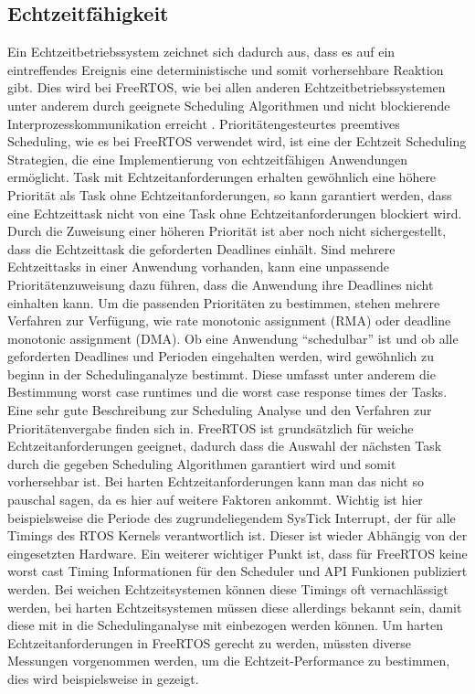 \subsection{Echtzeitfähigkeit}
Ein Echtzeitbetriebssystem zeichnet sich dadurch aus, dass es auf ein eintreffendes Ereignis eine deterministische und somit vorhersehbare Reaktion gibt. Dies wird bei FreeRTOS, wie bei allen anderen Echtzeitbetriebssystemen unter anderem durch geeignete Scheduling Algorithmen und nicht blockierende Interprozesskommunikation erreicht\cite{9780128015070} \cite{Jones:1997:CRT:269005.266689} \cite{Regehr:2001:ACR:882481.883779}. Prioritätengesteurtes preemtives Scheduling, wie es bei FreeRTOS verwendet wird, ist eine der Echtzeit Scheduling Strategien\cite{9780128015070}, die eine Implementierung von echtzeitfähigen Anwendungen ermöglicht. Task mit Echtzeitanforderungen erhalten gewöhnlich eine höhere Priorität als Task ohne Echtzeitanforderungen, so kann garantiert werden, dass eine Echtzeittask nicht von eine Task ohne Echtzeitanforderungen blockiert wird. Durch die Zuweisung einer höheren Priorität ist aber noch nicht sichergestellt, dass die Echtzeittask die geforderten Deadlines einhält. Sind mehrere Echtzeittasks in einer Anwendung vorhanden, kann eine unpassende Prioritätenzuweisung  dazu führen, dass die Anwendung ihre Deadlines nicht einhalten kann\cite{9780128015070}. Um die passenden Prioritäten zu bestimmen, stehen mehrere Verfahren zur Verfügung, wie rate monotonic assignment (RMA) oder deadline monotonic assignment (DMA). Ob eine Anwendung "`schedulbar"' ist und ob alle geforderten Deadlines und Perioden eingehalten werden, wird gewöhnlich zu beginn in der Schedulinganalyze bestimmt. Diese umfasst unter anderem die Bestimmung worst case runtimes und die worst case response times der Tasks. Eine sehr gute Beschreibung zur Scheduling Analyse und den Verfahren zur Prioritätenvergabe finden sich in\cite{9780128015070}. FreeRTOS ist grundsätzlich für weiche Echtzeitanforderungen geeignet, dadurch dass die Auswahl der nächsten Task durch die gegeben Scheduling Algorithmen garantiert wird und somit vorhersehbar ist. Bei harten Echtzeitanforderungen kann man das nicht so pauschal sagen, da es hier auf weitere Faktoren ankommt. Wichtig ist hier beispielsweise die Periode des zugrundeliegendem SysTick Interrupt, der für alle Timings des RTOS Kernels verantwortlich ist. Dieser ist wieder Abhängig von der eingesetzten Hardware. Ein weiterer wichtiger Punkt ist, dass für FreeRTOS keine worst cast Timing Informationen für den Scheduler und API Funkionen publiziert werden. Bei weichen Echtzeitsystemen können diese Timings oft vernachlässigt werden, bei harten Echtzeitsystemen müssen diese allerdings bekannt sein, damit diese mit in die Schedulinganalyse mit einbezogen werden können. Um harten Echtzeitanforderungen in FreeRTOS gerecht zu werden, müssten diverse Messungen vorgenommen werden, um die Echtzeit-Performance zu bestimmen, dies wird beispielsweise in\cite{RealTimePerformance} gezeigt.     